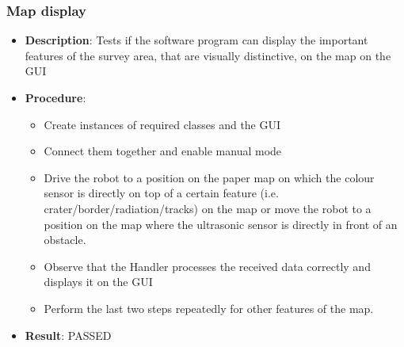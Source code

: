 \documentclass[12pt,a4paper]{article}
\begin{document}
	\subsubsection{Map display}
	\begin{itemize}
		\item \textbf{Description}: Tests if the software program can display the important features of the survey area, that are visually distinctive, on the map on the GUI
		\item \textbf{Procedure}:
		\begin{itemize}
			\item Create instances of required classes and the GUI
			\item Connect them together and enable manual mode
			\item Drive the robot to a position on the paper map on which the colour sensor is directly on top of a certain feature (i.e. crater/border/radiation/tracks) on the map or move the robot to a position on the map where the ultrasonic sensor is directly in front of an obstacle.
			\item Observe that the Handler processes the received data correctly and displays it on the GUI
			\item Perform the last two steps repeatedly for other features of the map.
		\end{itemize}
		\item \textbf{Result}:		PASSED
	\end{itemize}
	
\end{document}
